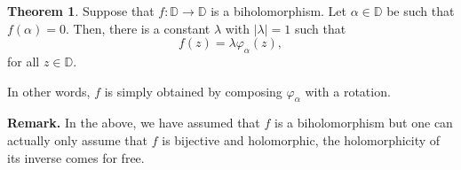 \documentclass[12pt]{article}
\theoremstyle{definition}
\newtheorem{thm}{Theorem}
\numberwithin{thm}{section}
\newcommand{\md}[1]{{\left\lvert #1 \right\lvert}}
\begin{document}
\begin{enumerate}
	\begin{thm}
		Suppose that $f : \mathbb{D} \to \mathbb{D}$ is a biholomorphism. Let $\alpha \in \mathbb{D}$ be such that $f(\alpha) = 0$. Then, there is a constant $\lambda$ with $\md{\lambda} = 1$ such that
		\begin{equation*} 
			f(z) = \lambda \varphi_{\alpha}(z),
		\end{equation*}
		for all $z \in \mathbb{D}$.
	\end{thm}

	In other words, $f$ is simply obtained by composing $\varphi_{\alpha}$ with a rotation. 

	\textbf{Remark.} In the above, we have assumed that $f$ is a biholomorphism but one can actually only assume that $f$ is bijective and holomorphic, the holomorphicity of its inverse comes for free.


\end{enumerate}
\end{document}
